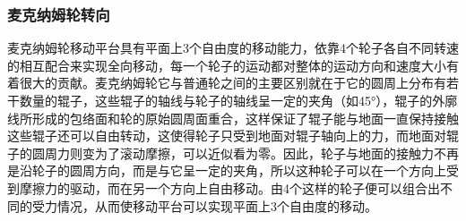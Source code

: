 \documentclass{report}
\begin{document}
\subsubsection{麦克纳姆轮转向\cite{mac}}
\label{subsec:label}
麦克纳姆轮移动平台具有平面上3个自由度的移动能力，依靠4个轮子各自不同转速的相互配合来实现全向移动，每一个轮子的运动都对整体的运动方向和速度大小有着很大的贡献。麦克纳姆轮它与普通轮之间的主要区别就在于它的圆周上分布有若干数量的辊子，这些辊子的轴线与轮子的轴线呈一定的夹角（如45°），辊子的外廓线所形成的包络面和轮的原始圆周面重合，这样保证了辊子能与地面一直保持接触这些辊子还可以自由转动，这使得轮子只受到地面对辊子轴向上的力，而地面对辊子的圆周力则变为了滚动摩擦，可以近似看为零。因此，轮子与地面的接触力不再是沿轮子的圆周方向，而是与它呈一定的夹角，所以这种轮子可以在一个方向上受到摩擦力的驱动，而在另一个方向上自由移动。由4个这样的轮子便可以组合出不同的受力情况，从而使移动平台可以实现平面上3个自由度的移动。
\end{document}
